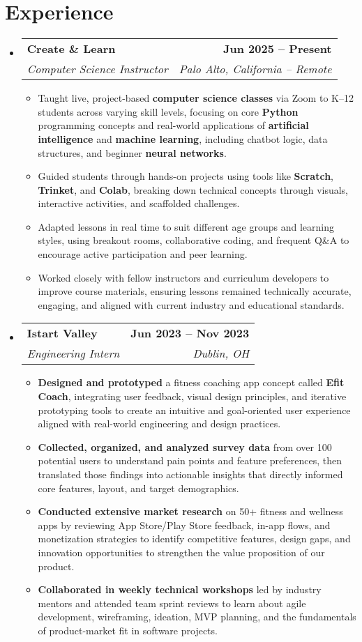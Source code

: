 \documentclass[letterpaper,11pt]{article}
\makeatletter
\newcommand{\resumeItem}[1]{
  \item\small{
    {#1 \vspace{0pt}}
  }
}
\newcommand{\resumeSubheading}[4]{
  \vspace{-2pt}\item
    \begin{tabular*}{1.0\textwidth}[t]{l@{\extracolsep{\fill}}r}
      \textbf{#1} & \textbf{\small #2} \\
      \textit{\small#3} & \textit{\small #4} \\
    \end{tabular*}\vspace{-7pt}
}
\newcommand{\resumeSubHeadingListStart}{\begin{itemize}[leftmargin=0.0in, label={}]}
\newcommand{\resumeSubHeadingListEnd}{\end{itemize}}\vspace{0pt}
\newcommand{\resumeItemListStart}{\begin{itemize}}
\newcommand{\resumeItemListEnd}{\end{itemize}\vspace{-5pt}}
\makeatother
\begin{document}
\section{Experience}
    \resumeSubHeadingListStart
                \resumeSubheading{Create \& Learn}{Jun 2025 -- Present}{Computer Science Instructor}{Palo Alto, California -- Remote} 
                \resumeItemListStart
                    \resumeItem{Taught live, project-based \textbf{computer science classes} via Zoom to K–12 students across varying skill levels, focusing on core \textbf{Python} programming concepts and real-world applications of \textbf{artificial intelligence} and \textbf{machine learning}, including chatbot logic, data structures, and beginner \textbf{neural networks}.}
                    \resumeItem{Guided students through hands-on projects using tools like \textbf{Scratch}, \textbf{Trinket}, and \textbf{Colab}, breaking down technical concepts through visuals, interactive activities, and scaffolded challenges.}
                    \resumeItem{Adapted lessons in real time to suit different age groups and learning styles, using breakout rooms, collaborative coding, and frequent Q\&A to encourage active participation and peer learning.}
                    \resumeItem{Worked closely with fellow instructors and curriculum developers to improve course materials, ensuring lessons remained technically accurate, engaging, and aligned with current industry and educational standards.}
                    \resumeItemListEnd
            \resumeSubheading{Istart Valley}{Jun 2023 -- Nov 2023}{Engineering Intern}{Dublin, OH} 
                \resumeItemListStart
                    \resumeItem{\textbf{Designed and prototyped} a fitness coaching app concept called \textbf{Efit Coach}, integrating user feedback, visual design principles, and iterative prototyping tools to create an intuitive and goal-oriented user experience aligned with real-world engineering and design practices.}
                    \resumeItem{\textbf{Collected, organized, and analyzed survey data} from over 100 potential users to understand pain points and feature preferences, then translated those findings into actionable insights that directly informed core features, layout, and target demographics.}
                    \resumeItem{\textbf{Conducted extensive market research} on 50+ fitness and wellness apps by reviewing App Store/Play Store feedback, in-app flows, and monetization strategies to identify competitive features, design gaps, and innovation opportunities to strengthen the value proposition of our product.}
                    \resumeItem{\textbf{Collaborated in weekly technical workshops} led by industry mentors and attended team sprint reviews to learn about agile development, wireframing, ideation, MVP planning, and the fundamentals of product-market fit in software projects.}
                    \resumeItemListEnd
    \resumeSubHeadingListEnd
    \vspace{-12pt}
\end{document}
